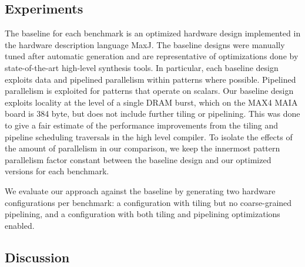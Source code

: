 


\subsection{Experiments}
The baseline for each benchmark is an optimized hardware design implemented in the
hardware description language MaxJ.
The baseline designs were manually tuned after automatic generation and are
representative of optimizations done by state-of-the-art high-level synthesis tools.
In particular, each baseline design exploits data and pipelined parallelism within patterns where possible.
Pipelined parallelism is exploited for patterns that operate on scalars. Our baseline design
exploits locality at the level of a single DRAM burst, which on the MAX4 MAIA board is 384 byte, but does not include further tiling or pipelining. This was done to
give a fair estimate of the performance improvements from the tiling and pipeline
scheduling traversals in the high level compiler.
To isolate the effects of the amount of parallelism in our comparison, we keep
the innermost pattern parallelism factor constant between the baseline design and our optimized versions for each benchmark.

We evaluate our approach against the baseline by generating two hardware configurations per benchmark:
a configuration with tiling but no coarse-grained pipelining, and a configuration with both tiling and pipelining optimizations enabled.

\subsection{Discussion}

